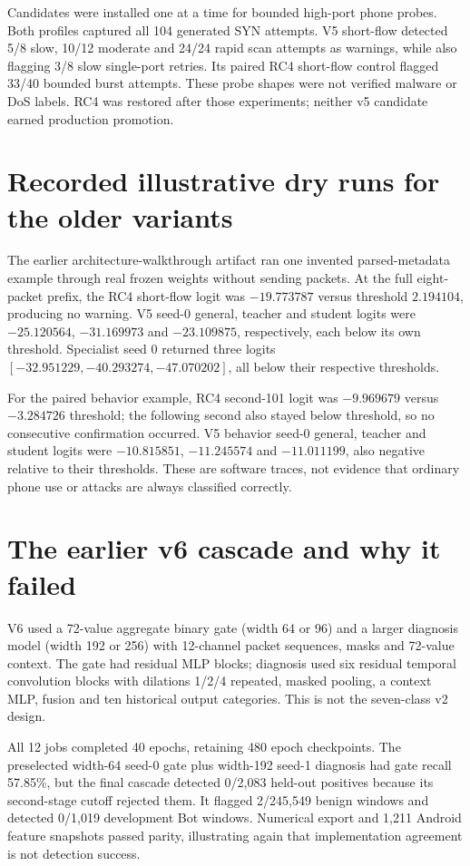 \documentclass[11pt,a4paper,oneside]{report}
\begin{document}
Candidates were installed one at a time for bounded high-port phone probes. Both profiles captured all 104 generated SYN attempts. V5 short-flow detected 5/8 slow, 10/12 moderate and 24/24 rapid scan attempts as warnings, while also flagging 3/8 slow single-port retries. Its paired RC4 short-flow control flagged 33/40 bounded burst attempts. These probe shapes were not verified malware or DoS labels. RC4 was restored after those experiments; neither v5 candidate earned production promotion.

\section{Recorded illustrative dry runs for the older variants}
The earlier architecture-walkthrough artifact ran one invented parsed-metadata example through real frozen weights without sending packets. At the full eight-packet prefix, the RC4 short-flow logit was $-19.773787$ versus threshold $2.194104$, producing no warning. V5 seed-0 general, teacher and student logits were $-25.120564$, $-31.169973$ and $-23.109875$, respectively, each below its own threshold. Specialist seed 0 returned three logits $[-32.951229,-40.293274,-47.070202]$, all below their respective thresholds.

For the paired behavior example, RC4 second-101 logit was $-9.969679$ versus $-3.284726$ threshold; the following second also stayed below threshold, so no consecutive confirmation occurred. V5 behavior seed-0 general, teacher and student logits were $-10.815851$, $-11.245574$ and $-11.011199$, also negative relative to their thresholds. These are software traces, not evidence that ordinary phone use or attacks are always classified correctly.

\section{The earlier v6 cascade and why it failed}
V6 used a 72-value aggregate binary gate (width 64 or 96) and a larger diagnosis model (width 192 or 256) with 12-channel packet sequences, masks and 72-value context. The gate had residual MLP blocks; diagnosis used six residual temporal convolution blocks with dilations 1/2/4 repeated, masked pooling, a context MLP, fusion and ten historical output categories. This is not the seven-class v2 design.

All 12 jobs completed 40 epochs, retaining 480 epoch checkpoints. The preselected width-64 seed-0 gate plus width-192 seed-1 diagnosis had gate recall 57.85\%, but the final cascade detected 0/2,083 held-out positives because its second-stage cutoff rejected them. It flagged 2/245,549 benign windows and detected 0/1,019 development Bot windows. Numerical export and 1,211 Android feature snapshots passed parity, illustrating again that implementation agreement is not detection success.
\end{document}
